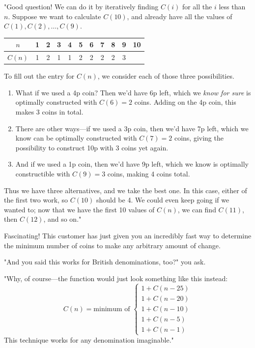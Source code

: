 \documentclass{article}
\begin{document}
"Good question! We can do it by iteratively finding $C(i)$ for all the $i$ less than $n$. Suppose we want to calculate $C(10)$, and already have all the values of $C(1), C(2), \dots, C(9)$.

\begin{table}[h]
    \centering
    \begin{tabular}{c|c|c|c|c|c|c|c|c|c|c}
        $n$ & 1 & 2 & 3 & 4 & 5 & 6 & 7 & 8 & 9 & 10 \\\hline
        $C(n)$ & 1 & 2 & 1 & 1 & 2 & 2 & 2 & 2 & 3 & 
    \end{tabular}
\end{table}
To fill out the entry for $C(n)$, we consider each of those three possibilities.
\begin{enumerate}
    \item What if we used a 4p coin? Then we'd have 6p left, which we \textit{know for sure} is optimally constructed with $C(6) = 2$ coins. Adding on the 4p coin, this makes 3 coins in total.

    \item There are other ways—if we used a 3p coin, then we'd have 7p left, which we know can be optimally constructed with $C(7) = 2$ coins, giving the possibility to construct 10p with 3 coins yet again.

    \item And if we used a 1p coin, then we'd have 9p left, which we know is optimally constructible with $C(9) = 3$ coins, making 4 coins total.
\end{enumerate}

Thus we have three alternatives, and we take the best one. In this case, either of the first two work, so $C(10)$ should be 4. We could even keep going if we wanted to; now that we have the first 10 values of $C(n)$, we can find $C(11)$, then $C(12)$, and so on."

Fascinating! This customer has just given you an incredibly fast way to determine the minimum number of coins to make any arbitrary amount of change.

"And you said this works for British denominations, too?" you ask.

"Why, of course—the function would just look something like this instead:
\[
C(n) = \text{minimum of }
\begin{cases}
    1 + C(n - 25) \\
    1 + C(n - 20) \\
    1 + C(n - 10) \\
    1 + C(n - 5) \\
    1 + C(n - 1)
\end{cases}
\]
This technique works for any denomination imaginable."
\end{document}
